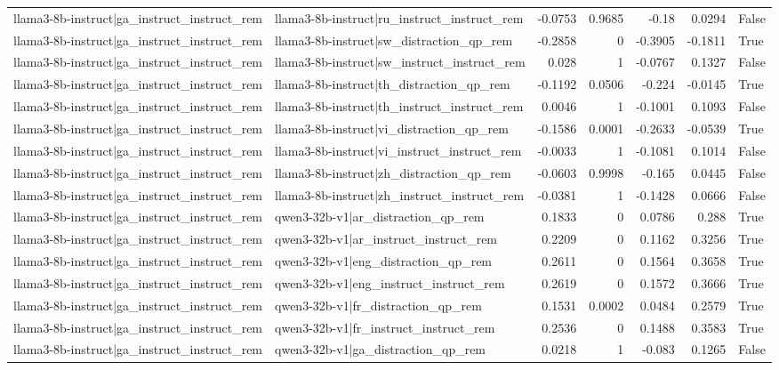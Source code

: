 \begin{table}
\begin{tabular}{l l r r r r l}
llama3-8b-instruct|ga_instruct_instruct_rem & llama3-8b-instruct|ru_instruct_instruct_rem & -0.0753 & 0.9685 & -0.18 & 0.0294 & False \\
llama3-8b-instruct|ga_instruct_instruct_rem & llama3-8b-instruct|sw_distraction_qp_rem & -0.2858 & 0 & -0.3905 & -0.1811 & True \\
llama3-8b-instruct|ga_instruct_instruct_rem & llama3-8b-instruct|sw_instruct_instruct_rem & 0.028 & 1 & -0.0767 & 0.1327 & False \\
llama3-8b-instruct|ga_instruct_instruct_rem & llama3-8b-instruct|th_distraction_qp_rem & -0.1192 & 0.0506 & -0.224 & -0.0145 & True \\
llama3-8b-instruct|ga_instruct_instruct_rem & llama3-8b-instruct|th_instruct_instruct_rem & 0.0046 & 1 & -0.1001 & 0.1093 & False \\
llama3-8b-instruct|ga_instruct_instruct_rem & llama3-8b-instruct|vi_distraction_qp_rem & -0.1586 & 0.0001 & -0.2633 & -0.0539 & True \\
llama3-8b-instruct|ga_instruct_instruct_rem & llama3-8b-instruct|vi_instruct_instruct_rem & -0.0033 & 1 & -0.1081 & 0.1014 & False \\
llama3-8b-instruct|ga_instruct_instruct_rem & llama3-8b-instruct|zh_distraction_qp_rem & -0.0603 & 0.9998 & -0.165 & 0.0445 & False \\
llama3-8b-instruct|ga_instruct_instruct_rem & llama3-8b-instruct|zh_instruct_instruct_rem & -0.0381 & 1 & -0.1428 & 0.0666 & False \\
llama3-8b-instruct|ga_instruct_instruct_rem & qwen3-32b-v1|ar_distraction_qp_rem & 0.1833 & 0 & 0.0786 & 0.288 & True \\
llama3-8b-instruct|ga_instruct_instruct_rem & qwen3-32b-v1|ar_instruct_instruct_rem & 0.2209 & 0 & 0.1162 & 0.3256 & True \\
llama3-8b-instruct|ga_instruct_instruct_rem & qwen3-32b-v1|eng_distraction_qp_rem & 0.2611 & 0 & 0.1564 & 0.3658 & True \\
llama3-8b-instruct|ga_instruct_instruct_rem & qwen3-32b-v1|eng_instruct_instruct_rem & 0.2619 & 0 & 0.1572 & 0.3666 & True \\
llama3-8b-instruct|ga_instruct_instruct_rem & qwen3-32b-v1|fr_distraction_qp_rem & 0.1531 & 0.0002 & 0.0484 & 0.2579 & True \\
llama3-8b-instruct|ga_instruct_instruct_rem & qwen3-32b-v1|fr_instruct_instruct_rem & 0.2536 & 0 & 0.1488 & 0.3583 & True \\
llama3-8b-instruct|ga_instruct_instruct_rem & qwen3-32b-v1|ga_distraction_qp_rem & 0.0218 & 1 & -0.083 & 0.1265 & False \\

\end{tabular}
\end{table}
